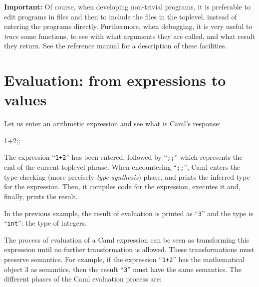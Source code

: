 {\bf Important:} Of course, when developing non-trivial programs, it
is preferable to edit programs in files and then to include the files
in the toplevel, instead of entering the programs directly.
Furthermore, when debugging, it is very useful to {\em trace} some
functions, to see with what arguments they are called, and what result
they return.  See the reference manual \cite{CamlLightDoc} for a
description of these facilities.

\section{Evaluation: from expressions to values}

Let us enter an arithmetic expression and see what is Caml's response:
\begin{caml_example}
1+2;;
\end{caml_example}
The expression ``\verb|1+2|'' has been entered, followed by
``\verb|;;|'' which represents the end of the current toplevel phrase. When
encountering ``\verb|;;|'', Caml enters the type-checking (more precisely {\em
type synthesis}) phase, and prints the inferred type for the expression. Then, it compiles code for the expression, executes it and, finally, prints the result.

In the previous example, the result of evaluation is printed
as ``\verb|3|'' and the type is ``\verb|int|'': the type of integers.

The process of evaluation of a Caml expression can be seen as transforming
this expression until no further transformation is allowed. These
transformations must preserve semantics. For example, if the expression
``\verb|1+2|'' has the mathematical object 3 as semantics, then the
result ``\verb|3|'' must have the same semantics.
The different phases of the Caml evaluation process are:

